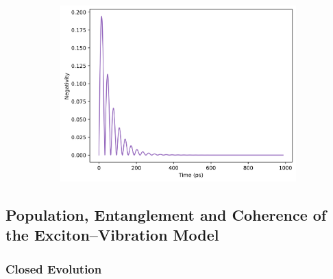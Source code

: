 \documentclass[12pt]{article}
\begin{document}
\begin{figure}[H]
    \begin{subfigure}{0.45\textwidth}
        \centering
        \includegraphics[width=0.85\linewidth]{Research Project/Code/results/JCM/OQS_Neg_Both_eg.png}
        \caption{}
        \label{fig:jcm_cqs_coh_eg}
    \end{subfigure}
    \hfill
    \caption{}
\end{figure}


\subsection{Population, Entanglement and Coherence of the Exciton--Vibration Model}
\subsubsection{Closed Evolution}
\end{document}
